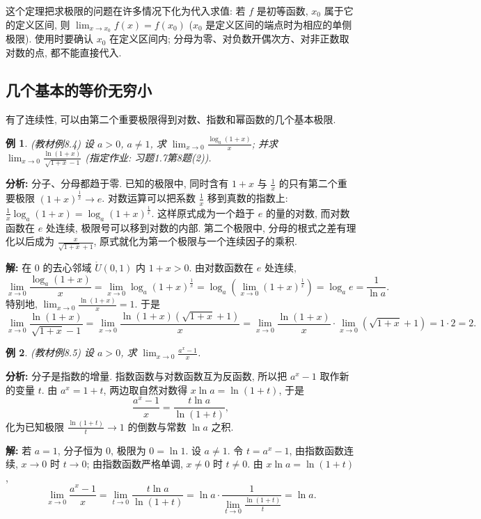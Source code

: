 \documentclass[UTF8,openany]{ctexbook}
\theoremstyle{chinesetextbook}
\newtheorem{example}{例}[section]
\newenvironment{cnsolution}{\par\indent\textbf{解:} \ignorespaces}{\par}
\begin{document}
这个定理把求极限的问题在许多情况下化为代入求值: 若 $f$ 是初等函数, $x_0$ 属于它的定义区间, 则 $\displaystyle\lim_{x\to x_0}f(x)=f(x_0)$ ($x_0$ 是定义区间的端点时为相应的单侧极限). 使用时要确认 $x_0$ 在定义区间内; 分母为零、对负数开偶次方、对非正数取对数的点, 都不能直接代入.
\subsection{几个基本的等价无穷小}
有了连续性, 可以由第二个重要极限得到对数、指数和幂函数的几个基本极限.
\begin{example}
\textnormal{(教材例8.4)} 设 $a>0$, $a\ne1$, 求 $\displaystyle\lim_{x\to0}\frac{\log_a(1+x)}x$; 并求 $\displaystyle\lim_{x\to0}\frac{\ln(1+x)}{\sqrt{1+x}-1}$ (指定作业: 习题1.7第8题(2)).
\end{example}
\par\indent\textbf{分析:} 分子、分母都趋于零. 已知的极限中, 同时含有 $1+x$ 与 $\displaystyle\frac1x$ 的只有第二个重要极限 $(1+x)^{\frac1x}\to e$. 对数运算可以把系数 $\displaystyle\frac1x$ 移到真数的指数上: $\displaystyle\frac1x\log_a(1+x)=\log_a(1+x)^{\frac1x}$. 这样原式成为一个趋于 $e$ 的量的对数, 而对数函数在 $e$ 处连续, 极限号可以移到对数的内部. 第二个极限中, 分母的根式之差有理化以后成为 $\displaystyle\frac x{\sqrt{1+x}+1}$, 原式就化为第一个极限与一个连续因子的乘积.
\begin{cnsolution}
在 $0$ 的去心邻域 $\mathring U(0,1)$ 内 $1+x>0$. 由对数函数在 $e$ 处连续,
\[
\lim_{x\to0}\frac{\log_a(1+x)}x=\lim_{x\to0}\log_a(1+x)^{\frac1x}=\log_a\left(\lim_{x\to0}(1+x)^{\frac1x}\right)=\log_ae=\frac1{\ln a}.
\]
特别地, $\displaystyle\lim_{x\to0}\frac{\ln(1+x)}x=1$. 于是
\[
\lim_{x\to0}\frac{\ln(1+x)}{\sqrt{1+x}-1}=\lim_{x\to0}\frac{\ln(1+x)\left(\sqrt{1+x}+1\right)}x=\lim_{x\to0}\frac{\ln(1+x)}x\cdot\lim_{x\to0}\left(\sqrt{1+x}+1\right)=1\cdot2=2.
\]
\end{cnsolution}
\begin{example}
\textnormal{(教材例8.5)} 设 $a>0$, 求 $\displaystyle\lim_{x\to0}\frac{a^x-1}x$.
\end{example}
\par\indent\textbf{分析:} 分子是指数的增量. 指数函数与对数函数互为反函数, 所以把 $a^x-1$ 取作新的变量 $t$. 由 $a^x=1+t$, 两边取自然对数得 $x\ln a=\ln(1+t)$, 于是
\[
\frac{a^x-1}x=\frac{t\ln a}{\ln(1+t)},
\]
化为已知极限 $\displaystyle\frac{\ln(1+t)}t\to1$ 的倒数与常数 $\ln a$ 之积.
\begin{cnsolution}
若 $a=1$, 分子恒为 $0$, 极限为 $0=\ln1$. 设 $a\ne1$. 令 $t=a^x-1$, 由指数函数连续, $x\to0$ 时 $t\to0$; 由指数函数严格单调, $x\ne0$ 时 $t\ne0$. 由 $x\ln a=\ln(1+t)$,
\[
\lim_{x\to0}\frac{a^x-1}x=\lim_{t\to0}\frac{t\ln a}{\ln(1+t)}=\ln a\cdot\frac1{\displaystyle\lim_{t\to0}\frac{\ln(1+t)}t}=\ln a.
\]
\end{cnsolution}
\end{document}
